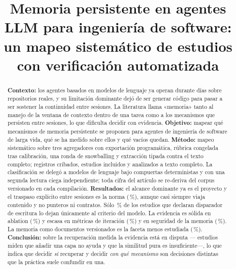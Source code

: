 \documentclass[conference]{IEEEtran}
\begin{document}
\title{Memoria persistente en agentes LLM para ingeniería de software:\\
un mapeo sistemático de \clCarAnalizados{} estudios con verificación automatizada}

\author{
}

\maketitle

\begin{abstract}
\textbf{Contexto:} los agentes basados en modelos de lenguaje ya operan durante días sobre
repositorios reales, y su limitación dominante dejó de ser generar código para pasar a ser sostener
la continuidad entre sesiones. La literatura llama «memoria» tanto al manejo de la ventana de
contexto dentro de una tarea como a los mecanismos que persisten entre sesiones, lo que dificulta
decidir con evidencia. \textbf{Objetivo:} mapear qué mecanismos de memoria persistente se proponen
para agentes de ingeniería de software de larga vida, qué se ha medido sobre ellos y qué vacíos
quedan. \textbf{Método:} mapeo sistemático sobre tres agregadores con exportación programática,
rúbrica congelada tras calibración, una ronda de snowballing y extracción tipada contra el texto
completo; \clSelUnicos{} registros cribados, \clSelIncluidosTotal{} estudios incluidos y
\clCarAnalizados{} analizados a texto completo. La clasificación se delegó a modelos de lenguaje
bajo compuertas deterministas y con una segunda lectura ciega independiente; toda cifra del artículo
se re-deriva del corpus versionado en cada compilación. \textbf{Resultados:} el alcance dominante ya
es el proyecto y el traspaso explícito entre sesiones es la norma (\clRQcuatroHandoffPct{}\,\%),
aunque casi siempre viaja contenido y no punteros ni contratos. Sólo \clRQdosSoloDiscrecionalPct{}\,\% de los estudios que
declaran disparador de escritura lo dejan únicamente al criterio del modelo. La evidencia
es sólida en ablation (\clRQcincoAblationPct{}\,\%) y escasa en métricas de iteración
(\clRQcincoMetricaIteracionPct{}\,\%) y en seguridad de la memoria
(\clRQseisSeguridadPct{}\,\%). La memoria como documentos versionados es la faceta menos estudiada
(\clMFdocsVersionadoPct{}\,\%). \textbf{Conclusión:} sobre la recuperación medida la evidencia está
en disputa —\clGMdosMenos{} estudios miden que añadir una capa no ayuda y \clGMdosMas{} que la
similitud pura es insuficiente—, lo que indica que decidir \emph{si} recuperar y decidir \emph{con
qué mecanismo} son decisiones distintas que la práctica suele confundir en una.
\end{abstract}
\end{document}
